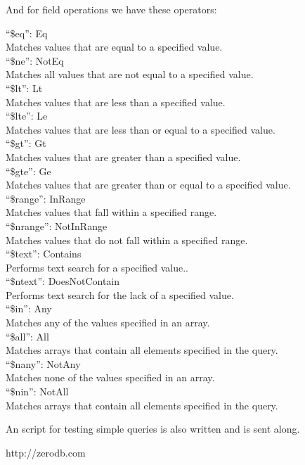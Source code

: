 \documentclass[twoside,twocolumn]{article}
\begin{document}
And for field operations we have these operators:
\begin{framed}

“\$eq”: Eq\\
    Matches values that are equal to a specified value.\\
“\$ne”: NotEq\\
    Matches all values that are not equal to a specified value.\\
“\$lt”: Lt\\
    Matches values that are less than a specified value.\\
“\$lte”: Le\\
    Matches values that are less than or equal to a specified value.\\
“\$gt”: Gt\\
    Matches values that are greater than a specified value.\\
“\$gte”: Ge\\
    Matches values that are greater than or equal to a specified value.\\
“\$range”: InRange\\
    Matches values that fall within a specified range.\\
“\$nrange”: NotInRange\\
    Matches values that do not fall within a specified range.\\
“\$text”: Contains\\
    Performs text search for a specified value..\\
“\$ntext”: DoesNotContain\\
    Performs text search for the lack of a specified value.\\
“\$in”: Any\\
    Matches any of the values specified in an array.\\
“\$all”: All\\
    Matches arrays that contain all elements specified in the query.\\
“\$nany”: NotAny\\
    Matches none of the values specified in an array.\\
“\$nin”: NotAll\\
    Matches arrays that contain all elements specified in the query. \\
   \end{framed}


An script for testing simple queries is also written and is sent along.




\begin{thebibliography}{99} %

\newblock http://zerodb.com
 
\end{thebibliography}

\end{document}

